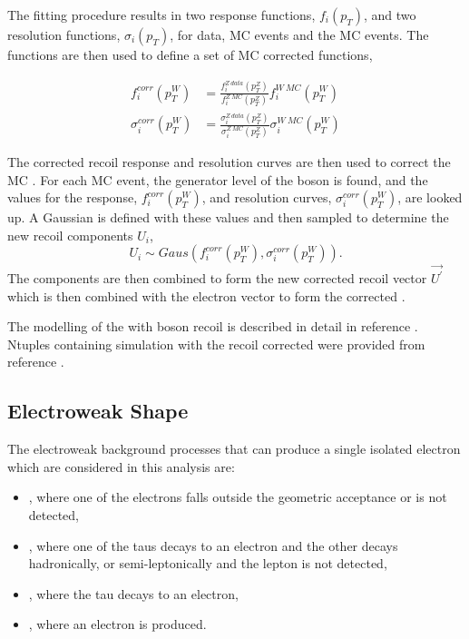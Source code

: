 The fitting procedure results in two response functions, $f_i(p_T)$, and two
resolution functions, $\sigma_i(p_T)$, for \PZ data, \PZ MC events and
the \PW MC events. The functions are then used to define a set of \PW
MC corrected functions, 

\begin{align}
f^{corr}_i (p^{W}_T)      
  &= \frac{ f^{Z\ data}_i (p^{Z}_T) }
          { f^{Z\ MC}_i (p^{Z}_T) }
          f^{W\ MC}_i (p^{W}_T) \\
\sigma^{corr}_i (p^{W}_T) 
  &= \frac{ \sigma^{Z\ data}_i (p^{Z}_T) }
          { \sigma^{Z\ MC}_i (p^{Z}_T) }
          \sigma^{W\ MC}_i (p^{W}_T) 
\end{align}

The corrected recoil response and resolution curves are then used to correct the
\PW MC \ETm. For each \PW MC event, the generator level \pT of the boson is
found, and the values for the response, $f^{corr}_i (p^{W}_T)$, and
resolution curves, $\sigma^{corr}_i (p^{W}_T) $, are looked up. A Gaussian is
defined with these values and then sampled to determine the new recoil
components $U_i$,
\begin{equation}
U_i \sim Gaus(f^{corr}_i (p^{W}_T), \sigma^{corr}_i (p^{W}_T) ).
\end{equation}
The components are then combined to form the new corrected recoil vector
$\vec{U^{\prime}}$ which is then combined with the electron vector to
form the corrected \ETm\cite{bauer2010modeling}.

The modelling of the \HepProcess{\PW\to\Plepton\Pnu} \ETm with boson recoil is
described in detail in reference \cite{bauer2010modeling}. 
Ntuples containing \HepProcess{\PW\to\Pelectron\Pnu} simulation with the recoil corrected \ETm were
provided from reference \cite{alcaraz2010updated}.

\subsection{{Electroweak} \ETm Shape}
The electroweak background processes that can produce a single isolated
electron which are considered in this analysis are:
\begin{itemize}
\item \HepProcess{\PZ\to\Pelectron\APelectron}, where one of the electrons falls
outside the geometric acceptance or is not detected,
\item \HepProcess{\PZ\to\Ptauon\APtauon}, where one of the taus decays
to an electron and the other decays hadronically, or semi-leptonically and the lepton
is not detected,
\item \HepProcess{\PW\to\Ptau\Pnu}, where the tau decays to an electron,
\item \HepProcess{\Ptop\APtop}, where an electron is produced.
\end{itemize}

